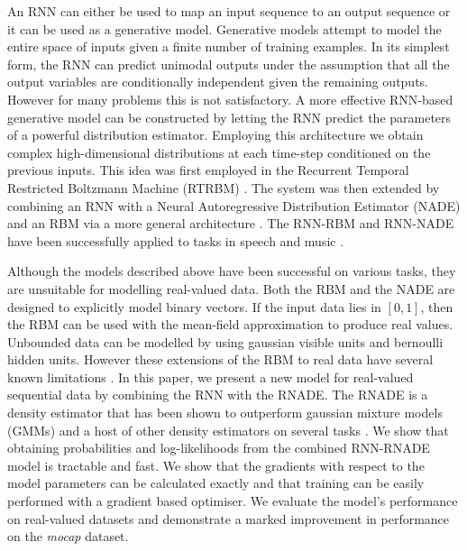 \documentclass{article} %
\begin{document}
An RNN can either be used to map an input sequence to an output sequence or it can be used as a generative model. Generative models attempt to model the entire space of inputs given a finite number of training examples. In its simplest form, the RNN can predict unimodal outputs under the assumption that all the output variables are conditionally independent given the remaining outputs. However for many problems this is not satisfactory. A more effective RNN-based generative model can be constructed by letting the RNN predict the parameters of a powerful distribution estimator. Employing this architecture we obtain complex high-dimensional distributions at each time-step conditioned on the previous inputs. This idea was first employed in the Recurrent Temporal Restricted Boltzmann Machine (RTRBM) \cite{Sutskever2008}. The system was then extended by combining an RNN with a Neural Autoregressive Distribution Estimator (NADE) and an RBM via a more general architecture \cite{Boulanger-Lewandowski2012}. The RNN-RBM and RNN-NADE have been successfully applied to tasks in speech and music \cite{boulangerphone,Boulanger-Lewandowski2012}. 

Although the models described above have been successful on various tasks, they are unsuitable for modelling real-valued data. Both the RBM and the NADE are designed to explicitly model binary vectors. If the input data lies in $[0,1]$, then the RBM can be used with the mean-field approximation to produce real values. Unbounded data can be modelled by using gaussian visible units and bernoulli hidden units. However these extensions of the RBM to real data have several known limitations \cite{theis2011all}. In this paper, we present a new model for real-valued sequential data by combining the RNN with the RNADE. The RNADE is a density estimator that has been shown to outperform gaussian mixture models (GMMs) and a host of other density estimators on several tasks \cite{Uria2013}. We show that obtaining probabilities and log-likelihoods from the combined RNN-RNADE model is tractable and fast. We show that the gradients with respect to the model parameters can be calculated exactly and that training can be easily performed with a gradient based optimiser. We evaluate the model's performance on real-valued datasets and demonstrate a marked improvement in performance on the {\it mocap} dataset. 
\end{document}
